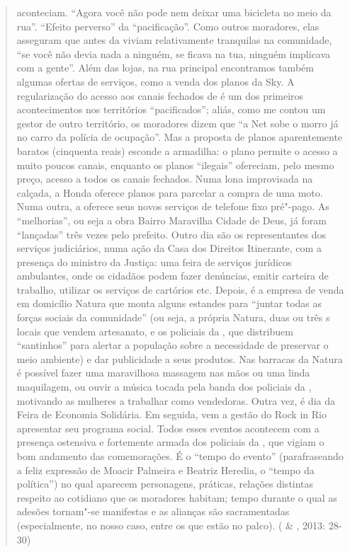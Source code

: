 \begin{quote}
aconteciam. ``Agora você não pode nem deixar uma bicicleta no meio da
rua''. ``Efeito perverso'' da ``pacificação''. Como outros moradores,
elas asseguram que antes da  viviam relativamente tranquilas na
comunidade, ``se você não devia nada a ninguém, se ficava na tua,
ninguém implicava com a gente''. Além das lojas, na rua principal
encontramos também algumas ofertas de serviços, como a venda dos planos
da Sky. A regularização do acesso aos canais fechados de  é um dos
primeiros acontecimentos nos territórios ``pacificados''; aliás, como me
contou um gestor de outro território, os moradores dizem que ``a Net
sobe o morro já no carro da polícia de ocupação''. Mas a proposta de
planos aparentemente baratos (cinquenta reais) esconde a armadilha: o
plano permite o acesso a muito poucos canais, enquanto os planos
``ilegais'' ofereciam, pelo mesmo preço, acesso a todos os canais
fechados. Numa lona improvisada na calçada, a Honda oferece planos para
parcelar a compra de uma moto. Numa outra, a  oferece seus novos
serviços de telefone fixo pré"-pago. As ``melhorias'', ou seja a obra
Bairro Maravilha Cidade de Deus, já foram ``lançadas'' três vezes pelo
prefeito. Outro dia são os representantes dos serviços judiciários, numa
ação da Casa dos Direitos Itinerante, com a presença do ministro da
Justiça: uma feira de serviços jurídicos ambulantes, onde os cidadãos
podem fazer denúncias, emitir carteira de trabalho, utilizar os serviços
de cartórios etc. Depois, é a empresa de venda em domicílio Natura que
monta alguns estandes para ``juntar todas as forças sociais da
comunidade'' (ou seja, a própria Natura, duas ou três s locais que
vendem artesanato, e os policiais da , que distribuem ``santinhos''
para alertar a população sobre a necessidade de preservar o meio
ambiente) e dar publicidade a seus produtos. Nas barracas da Natura é
possível fazer uma maravilhosa massagem nas mãos ou uma linda
maquilagem, ou ouvir a música tocada pela banda dos policiais da ,
motivando as mulheres a trabalhar como vendedoras. Outra vez, é dia da
Feira de Economia Solidária. Em seguida, vem a gestão do Rock in Rio
apresentar seu programa social. Todos esses eventos acontecem com a
presença ostensiva e fortemente armada dos policiais da , que vigiam
o bom andamento das comemorações. É o ``tempo do evento'' (parafraseando
a feliz expressão de Moacir Palmeira e Beatriz Heredia, o ``tempo da
política'') no qual aparecem personagens, práticas, relações distintas
respeito ao cotidiano que os moradores habitam; tempo durante o qual as
adesões tornam"-se manifestas e as alianças são sacramentadas
(especialmente, no nosso caso, entre os que estão no palco). ( \&
, 2013: 28-30)
\end{quote}

